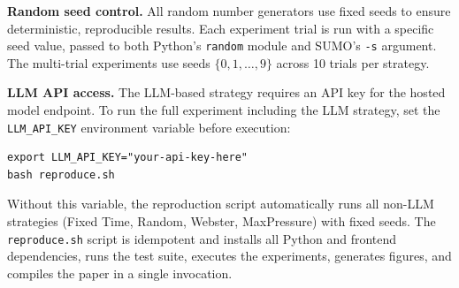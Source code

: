 \documentclass[conference]{IEEEtran}
\begin{document}
\textbf{Random seed control.} All random number generators use fixed seeds to ensure deterministic, reproducible results. Each experiment trial is run with a specific seed value, passed to both Python's \texttt{random} module and SUMO's \texttt{-s} argument. The multi-trial experiments use seeds $\{0, 1, \ldots, 9\}$ across 10 trials per strategy.

\textbf{LLM API access.} The LLM-based strategy requires an API key for the hosted model endpoint. To run the full experiment including the LLM strategy, set the \texttt{LLM\_API\_KEY} environment variable before execution:
\begin{verbatim}
export LLM_API_KEY="your-api-key-here"
bash reproduce.sh
\end{verbatim}
Without this variable, the reproduction script automatically runs all non-LLM strategies (Fixed Time, Random, Webster, MaxPressure) with fixed seeds. The \texttt{reproduce.sh} script is idempotent and installs all Python and frontend dependencies, runs the test suite, executes the experiments, generates figures, and compiles the paper in a single invocation.
\end{document}
